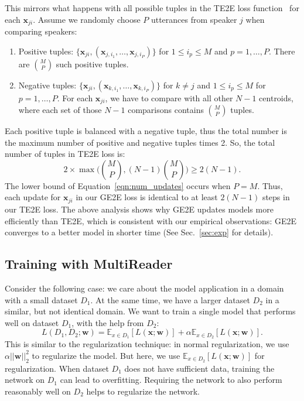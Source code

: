 \documentclass{article}
\newcommand{\vx}{\mathbf{x}}
\newcommand{\vw}{\mathbf{w}}
\newcommand{\E}{\mathbb{E}}
\begin{document}
This mirrors what happens with all possible tuples in the TE2E loss
function~\cite{heigold2016end} for each $\vx_{ji}$. Assume we randomly choose
$P$ utterances from speaker $j$ when comparing speakers:
\begin{enumerate}
  \item Positive tuples: $\{\vx_{ji}, (\vx_{j,i_1},\dots,\vx_{j,i_P})\}$ for $1\leq i_p\leq M$ and $p=1,\dots, P$.
    There are $\binom{M}{P}$ such positive tuples.
  \item Negative tuples: $\{\vx_{ji}, (\vx_{k,i_1},\dots,\vx_{k,i_P})\}$ for $k\neq j$ and
    $1\leq i_p\leq M$ for $p=1,\ldots ,P$. For each $\vx_{ji}$,
    we have to compare with all other $N-1$ centroids,
    where each set of those $N-1$ comparisons contains $\binom{M}{P}$ tuples.
\end{enumerate}
Each positive tuple is balanced with a negative tuple,
thus the total number is the maximum number of positive and negative tuples times 2.
So, the total number of tuples in TE2E loss is:
\begin{equation}
  \label{eqn:num_updates}
  2\times \max\Big(\binom{M}{P}, (N-1)\binom{M}{P}\Big)\geq 2(N-1) .
\end{equation}
The lower bound of Equation~\ref{eqn:num_updates} occurs when $P=M$.
Thus, each update for $\vx_{ji}$ in our GE2E loss is identical to at least $2(N-1)$ steps
in our TE2E loss. The above analysis shows why GE2E updates models more
efficiently than TE2E, which is consistent with our empirical observations:
GE2E converges to a better model in shorter time (See Sec.~\ref{sec:exp} for details).

\subsection{Training with MultiReader}
\label{sec:multireader}
Consider the following case: we care about the model application in a domain
with a small dataset $D_1$. At the same time, we have a larger dataset $D_2$
in a similar, but not identical domain.
We want to train a single model that performs well on dataset $D_1$,
with the help from $D_2$:
\begin{equation}
  L(D_1,D_2;\vw)=\E_{x\in D_1}[L(\vx;\vw)] + \alpha \E_{x\in D_2}[L(\vx;\vw)] .
\end{equation}
This is similar to the regularization technique:
in normal regularization, we use $\alpha||\vw||_2^2$ to regularize the model. But
here, we use $\E_{x\in D_2}[L(\vx;\vw)]$ for regularization.
When dataset $D_1$ does not have sufficient data,
training the network on $D_1$ can lead to overfitting. Requiring the network
to also perform reasonably well on $D_2$ helps to regularize the network.
\end{document}
